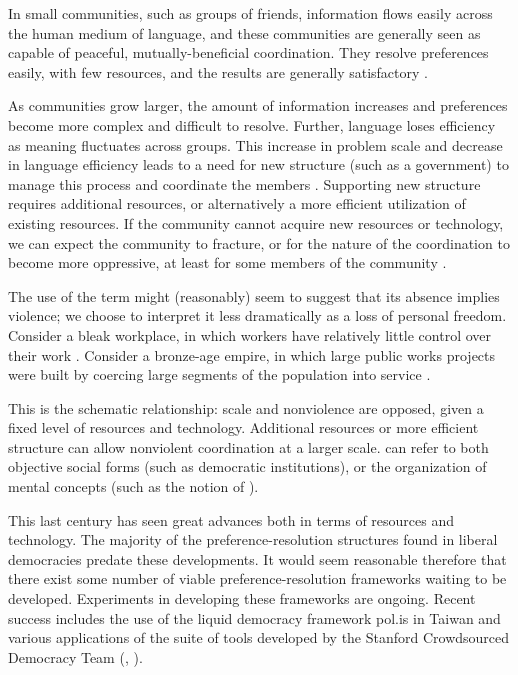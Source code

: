 In small communities, such as groups of friends, information flows easily across the human medium of language, and these communities are generally seen as capable of peaceful, mutually-beneficial coordination.
They resolve preferences easily, with few resources, and the results are generally satisfactory \citep{deacon}.

As communities grow larger, the amount of information increases and preferences become more complex and difficult to resolve.
Further, language loses efficiency as meaning fluctuates across groups.
This increase in problem scale and decrease in language efficiency leads to a need for new structure (such as a government) to manage this process and coordinate the members \citep{hobbes}.
Supporting new structure requires additional resources, or alternatively a more efficient utilization of existing resources.
If the community cannot acquire new resources or technology, we can expect the community to fracture, or for the nature of the coordination to become more oppressive, at least for some members of the community \citep{eisenberg}.

The use of the term  might (reasonably) seem to suggest that its absence implies violence; we choose to interpret it less dramatically as a loss of personal freedom.
Consider a bleak workplace, in which workers have relatively little control over their work \citep{lin}.
Consider a bronze-age empire, in which large public works projects were built by coercing large segments of the population into service \citep{heilbroner}.

\bigskip

This is the schematic relationship: scale and nonviolence are opposed, given a fixed level of resources and technology.
Additional resources or more efficient structure can allow nonviolent coordination at a larger scale.
 can refer to both objective social forms (such as democratic institutions), or the organization of mental concepts (such as the notion of ).

This last century has seen great advances both in terms of resources and technology.
The majority of the preference-resolution structures found in liberal democracies predate these developments.
It would seem reasonable therefore that there exist some number of viable preference-resolution frameworks waiting to be developed.
Experiments in developing these frameworks are ongoing.
Recent success includes the use of the liquid democracy framework pol.is in Taiwan \cite{barry} and various applications of the suite of tools developed by the Stanford Crowdsourced Democracy Team (\cite{lee:2015}, \cite{aitamurto:2016}).

